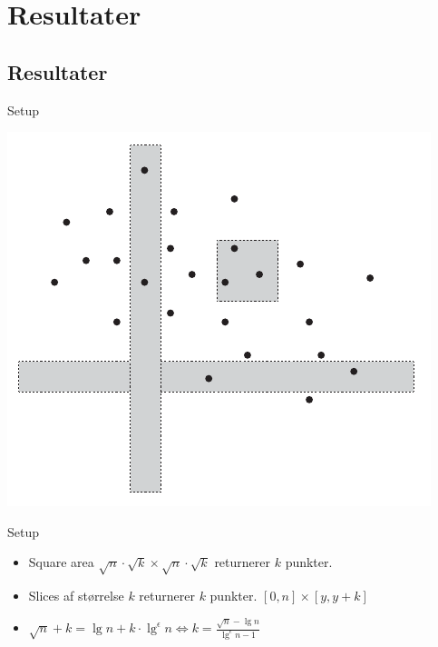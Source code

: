 \documentclass[pdf]{beamer}
\begin{document}
\section{Resultater}
\subsection{Resultater}

\begin{frame}{Setup}
  \begin{center}
    \includegraphics{pictures/felter.pdf}
  \end{center}
\end{frame}

\begin{frame}{Setup}
  \begin{itemize}
    \item Square area $\sqrt{n}\cdot\sqrt{k}\times\sqrt{n}\cdot\sqrt{k}$ returnerer $k$ punkter.
    \item Slices af størrelse $k$ returnerer $k$ punkter. $[0,n] \times [y, y+k]$
    \item $\sqrt{n}+k = \lg n + k\cdot\lg^\epsilon n \Leftrightarrow k = \frac{\sqrt{n}-\lg n}{\lg^\epsilon n -1}$
  \end{itemize}
\end{frame}
\end{document}
